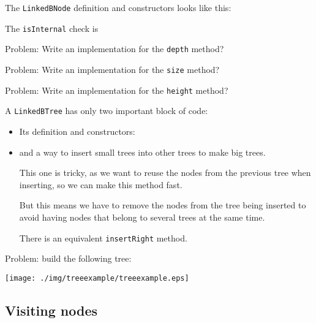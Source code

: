 \documentclass[a4paper, 9pt]{extarticle}
\begin{document}
The \texttt{LinkedBNode} definition and constructors looks like this:


The \texttt{isInternal} check is


Problem: Write an implementation for the \texttt{depth} method?


Problem: Write an implementation for the \texttt{size} method?


Problem: Write an implementation for the \texttt{height} method?


A \texttt{LinkedBTree} has only two important block of code:

\begin{itemize}

  \item Its definition and constructors:


  \item and a way to insert small trees into other trees to make big trees.

    This one is tricky, as we want to reuse the nodes from the previous tree
    when inserting, so we can make this method fast.

    But this means we have to remove the nodes from the tree being inserted to
    avoid having nodes that belong to several trees at the same time.


    There is an equivalent \texttt{insertRight} method.

\end{itemize}

Problem: build the following tree:

\begin{center}
  \texttt{[image: ./img/treeexample/treeexample.eps]}
\end{center}


\subsection{Visiting nodes}
\end{document}
